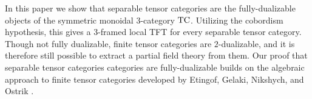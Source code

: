 \documentclass{amsart}
\begin{document}

In this paper we show that separable tensor categories are the fully-dualizable objects of the symmetric monoidal 3-category $\mathrm{TC}$. Utilizing the cobordism hypothesis, this gives a 3-framed local TFT for every separable tensor category. 
Though not fully dualizable, finite tensor categories are $2$-dualizable, and it is therefore still possible to extract a partial field theory from them.  
Our proof that separable tensor categories categories are fully-dualizable builds on the algebraic approach to finite tensor categories developed by Etingof, Gelaki, Nikshych, and Ostrik \cite{EGNO, MR2119143, MR2183279, MR2097289}.


\end{document}
